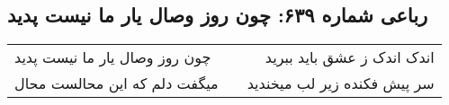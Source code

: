 \begin{center}
\section*{رباعی شماره ۶۳۹: چون روز وصال یار ما نیست پدید}
\label{sec:0639}
\begin{longtable}{l p{0.5cm} r}
چون روز وصال یار ما نیست پدید
&&
اندک اندک ز عشق باید ببرید
\\
میگفت دلم که این محالست محال
&&
سر پیش فکنده زیر لب میخندید
\\
\end{longtable}
\end{center}
